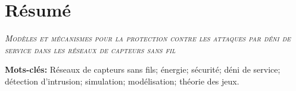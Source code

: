 \chapter[Résumé (français)]{Résumé}

\begin{center}
    \LARGE\it\scshape\color{chapterLACL}Modèles et mécanismes pour la protection contre les attaques par déni de service dans les réseaux de capteurs sans fil
\end{center}
\vspace{2\baselineskip}



\vspace{2\baselineskip}
\noindent\textbf{Mots-clés:} Réseaux de capteurs sans fils; énergie; sécurité; déni de service; détection d'intrusion; simulation; modélisation; théorie des jeux.
